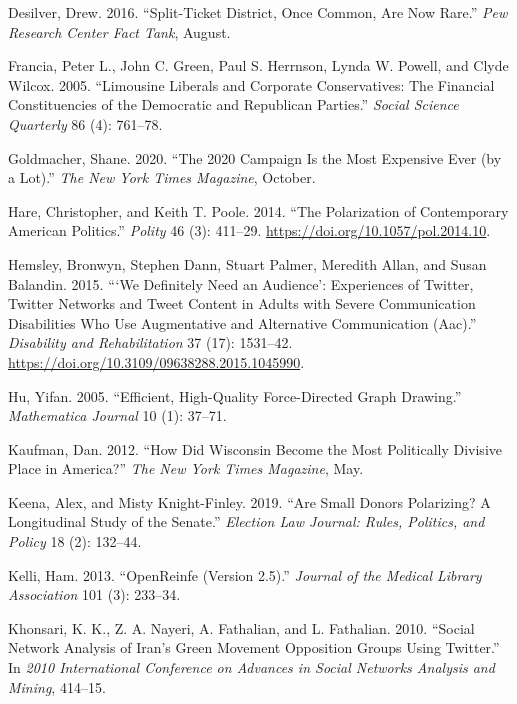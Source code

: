 \documentclass[12pt,]{article}
\begin{document}
\leavevmode\hypertarget{ref-desilver2016}{}%
Desilver, Drew. 2016. ``Split-Ticket District, Once Common, Are Now
Rare.'' \emph{Pew Research Center Fact Tank}, August.

\leavevmode\hypertarget{ref-francia2005}{}%
Francia, Peter L., John C. Green, Paul S. Herrnson, Lynda W. Powell, and
Clyde Wilcox. 2005. ``Limousine Liberals and Corporate Conservatives:
The Financial Constituencies of the Democratic and Republican Parties.''
\emph{Social Science Quarterly} 86 (4): 761--78.

\leavevmode\hypertarget{ref-goldmacher2020}{}%
Goldmacher, Shane. 2020. ``The 2020 Campaign Is the Most Expensive Ever
(by a Lot).'' \emph{The New York Times Magazine}, October.

\leavevmode\hypertarget{ref-hare2014}{}%
Hare, Christopher, and Keith T. Poole. 2014. ``The Polarization of
Contemporary American Politics.'' \emph{Polity} 46 (3): 411--29.
\url{https://doi.org/10.1057/pol.2014.10}.

\leavevmode\hypertarget{ref-hemsley2015}{}%
Hemsley, Bronwyn, Stephen Dann, Stuart Palmer, Meredith Allan, and Susan
Balandin. 2015. ```We Definitely Need an Audience': Experiences of
Twitter, Twitter Networks and Tweet Content in Adults with Severe
Communication Disabilities Who Use Augmentative and Alternative
Communication (Aac).'' \emph{Disability and Rehabilitation} 37 (17):
1531--42. \url{https://doi.org/10.3109/09638288.2015.1045990}.

\leavevmode\hypertarget{ref-yifanhu}{}%
Hu, Yifan. 2005. ``Efficient, High-Quality Force-Directed Graph
Drawing.'' \emph{Mathematica Journal} 10 (1): 37--71.

\leavevmode\hypertarget{ref-kaufman2012}{}%
Kaufman, Dan. 2012. ``How Did Wisconsin Become the Most Politically
Divisive Place in America?'' \emph{The New York Times Magazine}, May.

\leavevmode\hypertarget{ref-keena2019}{}%
Keena, Alex, and Misty Knight-Finley. 2019. ``Are Small Donors
Polarizing? A Longitudinal Study of the Senate.'' \emph{Election Law
Journal: Rules, Politics, and Policy} 18 (2): 132--44.

\leavevmode\hypertarget{ref-openrefine}{}%
Kelli, Ham. 2013. ``OpenReinfe (Version 2.5).'' \emph{Journal of the
Medical Library Association} 101 (3): 233--34.

\leavevmode\hypertarget{ref-khonsari2010}{}%
Khonsari, K. K., Z. A. Nayeri, A. Fathalian, and L. Fathalian. 2010.
``Social Network Analysis of Iran's Green Movement Opposition Groups
Using Twitter.'' In \emph{2010 International Conference on Advances in
Social Networks Analysis and Mining}, 414--15.
\end{document}
